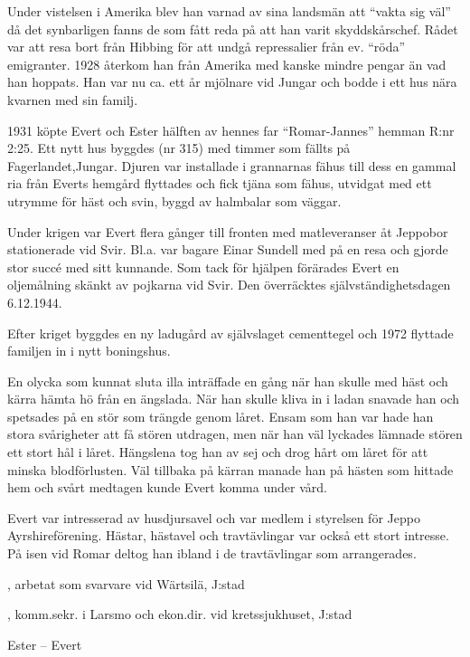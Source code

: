 Under vistelsen i Amerika blev han varnad av sina landsmän att ``vakta sig väl'' då det synbarligen fanns de som fått reda på att han varit skyddskårschef. Rådet var att resa bort från Hibbing för att undgå repressalier från ev. ``röda'' emigranter. 1928 återkom han från Amerika med kanske mindre pengar än vad han hoppats. Han var nu ca. ett år mjölnare vid Jungar och bodde i ett hus nära kvarnen med sin familj.

1931 köpte Evert och Ester hälften av hennes far ``Romar-Jannes'' hemman R:nr 2:25. Ett nytt hus byggdes (nr 315) med timmer som fällts på Fagerlandet,Jungar. Djuren var installade i grannarnas fähus till dess en gammal ria från Everts hemgård flyttades och fick tjäna som fähus, utvidgat med  ett utrymme för häst och svin, byggd av halmbalar som väggar.

Under krigen var Evert flera gånger till fronten med matleveranser åt Jeppobor stationerade vid Svir. Bl.a. var bagare Einar Sundell med på en resa och gjorde stor succé med sitt kunnande. Som tack för hjälpen förärades Evert en oljemålning skänkt av pojkarna vid Svir. Den överräcktes självständighetsdagen 6.12.1944.

Efter kriget byggdes en ny ladugård av självslaget cementtegel och 1972 flyttade familjen in i nytt boningshus.

En olycka som kunnat sluta illa inträffade en gång när han skulle med häst och kärra hämta hö från en ängslada. När han skulle kliva in i ladan snavade han och spetsades på en stör som trängde genom låret. Ensam som han var hade han stora svårigheter att få stören utdragen, men när han väl lyckades lämnade stören ett stort hål i låret. Hängslena tog han av sej och drog hårt om låret för att minska blodförlusten. Väl tillbaka på kärran manade han på hästen som hittade hem och svårt medtagen kunde Evert komma under vård.

Evert var intresserad av husdjursavel och var medlem i styrelsen för Jeppo Ayrshireförening. Hästar, hästavel och travtävlingar var också ett stort intresse. På isen vid Romar deltog han ibland i de travtävlingar som arrangerades.
\begin{jhchildren}
  \item {}
  \item {}, arbetat som svarvare vid Wärtsilä, J:stad
  \item {}
  \item {}, komm.sekr. i Larsmo och ekon.dir. vid kretssjukhuset, J:stad
\end{jhchildren}
Ester   --  Evert 



